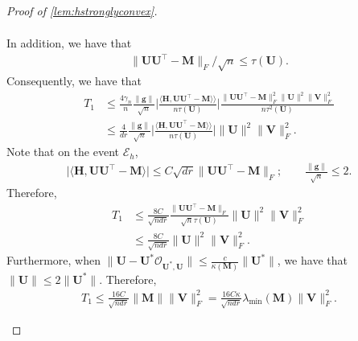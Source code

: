 \documentclass[10pt]{article}
\newcommand{\s}{^*}
\renewcommand{\t}{^{\top}}
\theoremstyle{definition}
\begin{document}
\begin{proof}[Proof of \cref{lem:hstronglyconvex}]
\begin{itemize}
\begin{align}
\end{align}
In addition, we have that
\begin{align}
    \| \bm{UU}\t - \bm{M} \|_F/\sqrt{n} \leq \tau(\bm{U}).
\end{align}
Consequently, we have that
\begin{align}
    T_1 &\leq \frac{4 \gamma_n}{n} \frac{\|\bm{g}\|}{\sqrt{n}}\bigg| \frac{\langle \bm{H},\bm{UU}\t - \bm{M} \rangle \rangle}{n \tau(\bm{U})} \bigg| \frac{\|\bm{UU}\t - \bm{M}\|_F^2 \|\bm{U}\|^2 \|\bm{V} \|_F^2}{n \tau^2(\bm{U})} \\
    &\leq \frac{4}{dr} \frac{\|\bm{g}\|}{\sqrt{n}}\bigg| \frac{\langle \bm{H},\bm{UU}\t - \bm{M} \rangle \rangle}{n \tau(\bm{U})} \bigg| \| \bm{U}\|^2 \|\bm{V} \|_F^2.
\end{align}
Note that on the event $\mathcal{E}_h$,
\begin{align}
    \bigg| \bigg\langle \bm{H}, \bm{UU}\t - \bm{M} \bigg \rangle \bigg| \leq C \sqrt{dr} \| \bm{UU}\t - \bm{M} \|_F; \qquad  \frac{\|\bm{g}\|}{\sqrt{n}} \leq 2.   \end{align}
Therefore,
\begin{align}
    T_1 &\leq \frac{8C}{\sqrt{ndr}} \frac{\|\bm{UU}\t - \bm{M}\|_F}{\sqrt{n} \tau(\bm{U})} \|\bm{U} \|^2 \|\bm{V} \|_F^2 \\
    &\leq \frac{8C}{\sqrt{ndr}}\|\bm{U} \|^2 \|\bm{V} \|_F^2.
\end{align}
Furthermore, when $\|\bm{U} - \bm{U}\s \mathcal{O}_{\bm{U}\s,\bm{U}} \| \leq \frac{c}{\kappa(\bm{M})} \| \bm{U}\s \|$, we have that $\|\bm{U}\| \leq 2 \|\bm{U}\s\|$.  Therefore,
\begin{align}
    T_1 \leq \frac{16C}{\sqrt{ndr}} \|\bm{M} \| \|\bm{V} \|_F^2 = \frac{16 C \kappa}{\sqrt{ndr}} \lambda_{\min}(\bm{M}) \|\bm{V} \|_F^2.
\end{align}



\end{itemize}
\end{proof}
\end{document}

